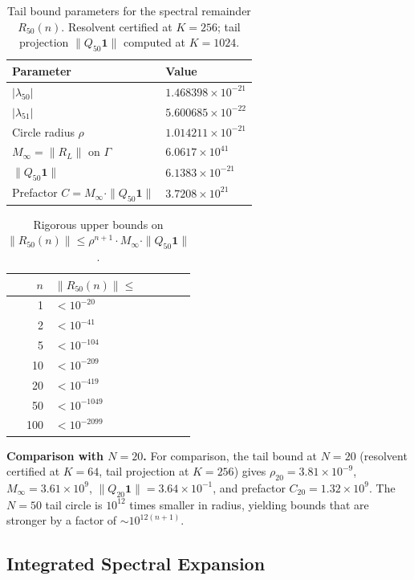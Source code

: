 \documentclass[11pt]{article}
\begin{document}
\begin{table}[ht]
\centering
\caption{Tail bound parameters for the spectral remainder $R_{50}(n)$.
Resolvent certified at $K = 256$; tail projection $\|Q_{50}\mathbf{1}\|$ computed at $K=1024$.}
\label{S-tab:tail-bound}
\begin{tabular}{ll}
\toprule
Parameter & Value \\
\midrule
$|\lambda_{50}|$ & $1.468398 \times 10^{-21}$ \\
$|\lambda_{51}|$ & $5.600685 \times 10^{-22}$ \\
Circle radius $\rho$ & $1.014211 \times 10^{-21}$ \\
$M_\infty = \|R_L\|$ on $\Gamma$ & $6.0617 \times 10^{41}$ \\
$\|Q_{50} \mathbf{1}\|$ & $6.1383 \times 10^{-21}$ \\
Prefactor $C = M_\infty \cdot \|Q_{50}\mathbf{1}\|$ & $3.7208 \times 10^{21}$ \\
\bottomrule
\end{tabular}
\end{table}

\begin{table}[ht]
\centering
\caption{Rigorous upper bounds on $\|R_{50}(n)\| \leq \rho^{n+1} \cdot M_\infty \cdot \|Q_{50}\mathbf{1}\|$.}
\label{S-tab:tail-bounds-sample}
\begin{tabular}{rl}
\toprule
$n$ & $\|R_{50}(n)\| \leq$ \\
\midrule
1 & $< 10^{-20}$ \\
2 & $< 10^{-41}$ \\
5 & $< 10^{-104}$ \\
10 & $< 10^{-209}$ \\
20 & $< 10^{-419}$ \\
50 & $< 10^{-1049}$ \\
100 & $< 10^{-2099}$ \\
\bottomrule
\end{tabular}
\end{table}

\medskip\noindent
\textbf{Comparison with $N = 20$.}
For comparison, the tail bound at $N = 20$ (resolvent certified at $K = 64$,
tail projection at $K = 256$) gives $\rho_{20} = 3.81 \times 10^{-9}$,
$M_\infty = 3.61 \times 10^{9}$, $\|Q_{20}\mathbf{1}\| = 3.64 \times 10^{-1}$,
and prefactor $C_{20} = 1.32 \times 10^{9}$.
The $N = 50$ tail circle is $10^{12}$ times smaller in radius,
yielding bounds that are stronger by a factor of $\sim 10^{12(n+1)}$.

\subsection*{Integrated Spectral Expansion}
\end{document}
